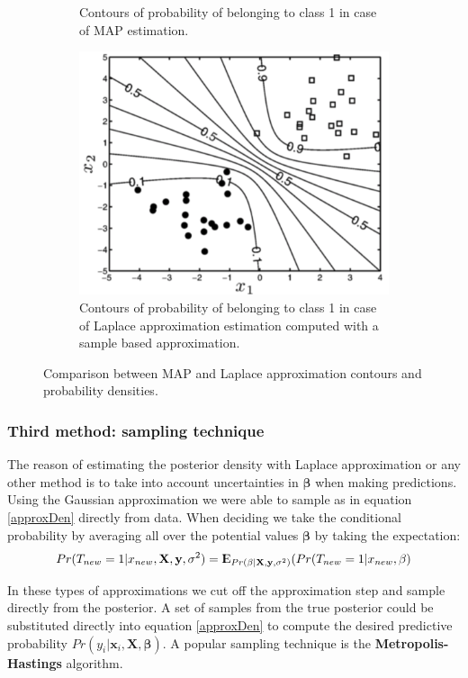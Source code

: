 \documentclass[12pt, letterpaper]{article}
\theoremstyle{definition}
\newcommand{\E}{{\rm I\kern-.3em E}}
\newcommand{\X}{\mathrm{\mathbf{X}}}
\newcommand{\y}{\mathbf{y}}
\newcommand{\be}{\mathbf{\beta}}
\newcommand{\x}{\mathbf{x}}
\DeclarePairedDelimiter\autobracket{(}{)}
\newcommand{\br}[1]{\autobracket*{#1}}
\begin{document}
\begin{figure}
\begin{subfigure}[t]{0.5\textwidth}
\caption{Contours of probability of belonging to class 1 in case of MAP estimation.}
\label{MAP2}
\end{subfigure}
\hfill
\begin{subfigure}[t]{0.5\textwidth}
\centering
\includegraphics[width=0.8\linewidth]{img/laplace2}
\caption{Contours of probability of belonging to class 1 in case of Laplace approximation estimation computed with a sample based approximation.}
\label{laplace2}
\end{subfigure}
\caption{Comparison between MAP and Laplace approximation contours and probability densities.}
\end{figure}

\subsubsection{Third method: sampling technique	}
The reason of estimating the posterior density with Laplace approximation or any other method is to take into account uncertainties in $\be$ when making predictions. Using the Gaussian approximation we were able to sample as in equation \ref{approxDen} directly from data. When deciding we take the conditional probability by averaging all over the potential values $\be$ by taking the expectation:
\begin{equation}
Pr(T_{new}=1| x_{new}, \X, \y, \sigma^2) = \E_{Pr(\be|\X, \y, \sigma^2)}\br{Pr(T_{new}=1|x_{new},\be}
\end{equation}

In these types of approximations we cut off the approximation step and sample directly from the posterior. A set of samples from the true posterior could be substituted directly into equation \ref{approxDen} to compute the desired predictive probability $Pr(y_i|\x_i, \X, \be)$. A popular sampling technique is the \textbf{Metropolis-Hastings} algorithm.
\end{document}
